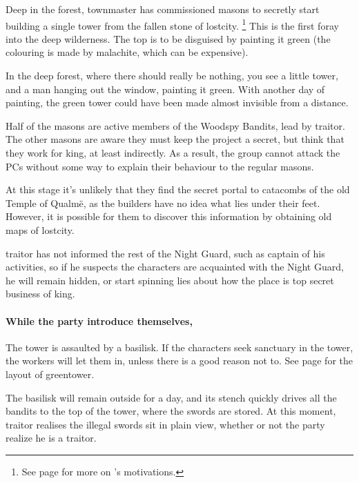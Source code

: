 \begin{multicols}{2}
Deep in the forest, \gls{townmaster} has commissioned masons to secretly start building a single tower from the fallen stone of \gls{lostcity}.
\footnote{See page \pageref{expanding_wilderness} for more on 's motivations.}
This is the first foray into the deep wilderness.
The top is to be disguised by painting it green (the colouring is made by malachite, which can be expensive).

\begin{boxtext}

	In the deep forest, where there should really be nothing, you see a little tower, and a man hanging out the window, painting it green.
	With another day of painting, the green tower could have been made almost invisible from a distance.

\end{boxtext}

Half of the masons are active members of the Woodspy Bandits, lead by \gls{traitor}.
The other masons are aware they must keep the project a secret, but think that they work for \gls{king}, at least indirectly.
As a result, the group cannot attack the PCs without some way to explain their behaviour to the regular masons.

At this stage it's unlikely that they find the secret portal to catacombs of the old Temple of Qualm\"{e}, as the builders have no idea what lies under their feet.
However, it is possible for them to discover this information by obtaining old maps of \gls{lostcity}.

\Gls{traitor} has not informed the rest of the Night Guard, such as \gls{captain} of his activities, so if he suspects the characters are acquainted with the Night Guard, he will remain hidden, or start spinning lies about how the place is top secret business of \gls{king}.

\paragraph{While the party introduce themselves,}
The tower is assaulted by a basilisk.
If the characters seek sanctuary in the tower, the workers will let them in, unless there is a good reason not to.
See page \pageref{green_tower} for the layout of \gls{greentower}.

The basilisk will remain outside for a day, and its stench quickly drives all the bandits to the top of the tower, where the swords are stored.
At this moment, \gls{traitor} realises the illegal swords sit in plain view, whether or not the party realize he is a traitor.


\end{multicols}

